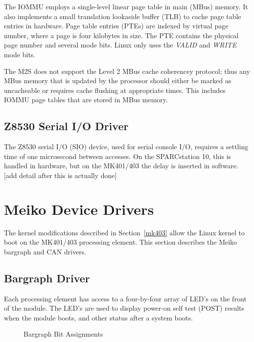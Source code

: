 \documentclass{article}
\begin{document}
  The IOMMU employs a single-level linear page table in main (MBus) memory.
It also implements a small translation lookaside buffer (TLB) to cache
page table entries in hardware.  Page table entries (PTEs) are indexed by 
virtual page number, where a page is four kilobytes in size.  The PTE contains
the physical page number and several mode bits.  Linux only uses the 
{\em VALID} and {\em WRITE} mode bits.

  The M2S does not support the Level 2 MBus cache coherencey 
protocol\cite{Ross93}; thus any MBus memory that is updated by the 
processor should either be marked as uncacheable or requires cache 
flushing at appropriate times.  This includes IOMMU page tables that 
are stored in MBus memory.

\subsection{Z8530 Serial I/O Driver}

The Z8530 serial I/O (SIO) device, used for serial console I/O, 
requires a settling time of one microsecond between accesses. 
On the SPARCstation 10, this is handled in hardware, but on the MK401/403
the delay is inserted in software.
[add detail after this is actually done]

\section{Meiko Device Drivers}\label{drivers}

The kernel modifications described in Section~\ref{mk403} allow the 
Linux kernel to boot on the MK401/403 processing element.  
This section describes the Meiko bargraph and CAN drivers.

\subsection{Bargraph Driver}

Each processing element has access to a four-by-four array of LED's on the
front of the module.  The LED's are used to display power-on self test (POST)
results when the module boots, and other status after a system boots.

\begin{figure}
\begin{center}
\caption{Bargraph Bit Assignments}
\label{bargraph}
\end{center}
\end{figure}
\end{document}
